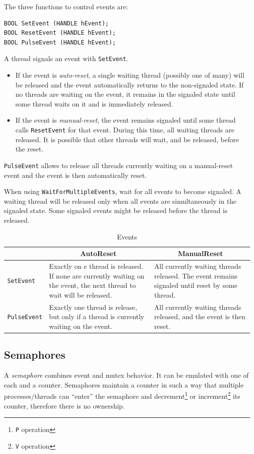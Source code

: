 \medskip
The three functions to control events are:
\begin{verbatim}
BOOL SetEvent (HANDLE hEvent);
BOOL ResetEvent (HANDLE hEvent);
BOOL PulseEvent (HANDLE hEvent);
\end{verbatim}
A thread signals an event with \texttt{SetEvent}.
\begin{itemize}
\item If the event is \textit{auto-reset}, a single waiting thread (possibly one of many) will be released and the event automatically returns to the non-signaled state. If no threads are waiting on the event, it remains in the signaled state until some thread waits on it and is immediately released.
\item If the event is \textit{manual-reset}, the event remains signaled until some thread calls \texttt{ResetEvent} for that event. During this time, all waiting threads are released. It is possible that other threads will wait, and be released, before the reset.
\end{itemize}

\texttt{PulseEvent} allows to release all threads currently waiting on a manual-reset event and the event is then automatically reset.

When using \texttt{WaitForMultipleEvents}, wait for all events to become signaled. A waiting thread will be released only when all events are simultaneously in the signaled state. Some signaled events might be released before the thread is released.

\begin{table}
\centering
\begin{tabularx}{\textwidth}{|l|X|X|}
\hline
& \multicolumn{1}{c|}{AutoReset} & \multicolumn{1}{c|}{ManualReset} \\
\hline
\texttt{SetEvent} & Exactly on e thread is released. If none are currently waiting on the event, the next thread to wait will be released. & All currently waiting threads released. The event remains signaled until reset by some thread. \\
\hline
\texttt{PulseEvent} & Exactly one thread is release, but only if a thread is currently waiting on the event. & All currently waiting threads released, and the event is then reset. \\
\hline
\end{tabularx}
\caption{Events}
\end{table}

\subsection{Semaphores}
A \emph{semaphore} combines event and mutex behavior. It can be emulated with one of each and a counter. Semaphores maintain a counter in such a way that multiple processes/threads can ``enter'' the semaphore and decrement\footnote{\texttt{P} operation} or increment\footnote{\texttt{V} operation} its counter, therefore there is no ownership.

